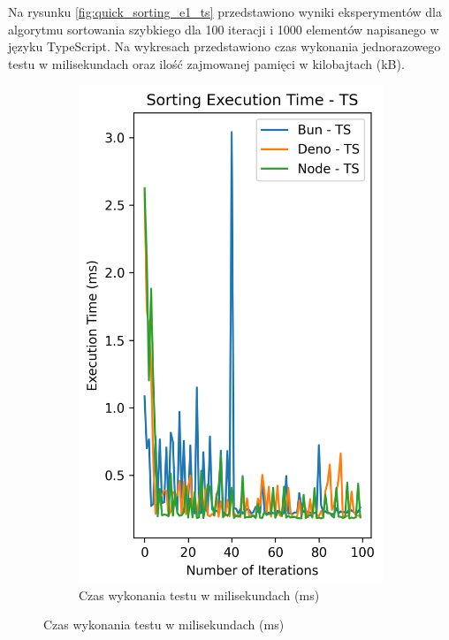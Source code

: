 Na rysunku \ref{fig:quick_sorting_e1_ts} przedstawiono wyniki eksperymentów dla algorytmu sortowania szybkiego dla 100 iteracji i 1000 elementów napisanego w języku TypeScript. Na wykresach przedstawiono czas wykonania jednorazowego testu w milisekundach oraz ilość zajmowanej pamięci w kilobajtach (kB).

\begin{figure}[H]
  \centering
  \begin{subfigure}[b]{0.42\textwidth}
    \centering
    \includegraphics[width=\textwidth]{Figures/sorting/sorting_quick_100_1000_ts_time.png}
    \caption{Czas wykonania testu w milisekundach (ms)}
    \label{fig:quick_sorting_e1_tsquick_sorting_e1_time}

\end{subfigure}
\end{figure}
